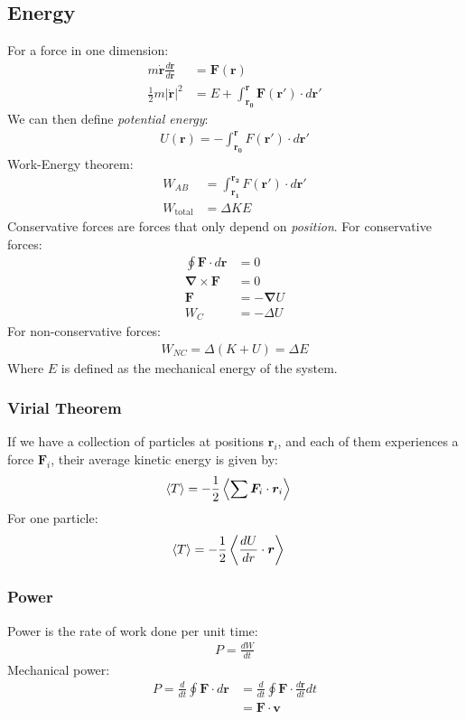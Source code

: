 \documentclass[a4paper]{article}
\newcommand{\ve}[1]{
  \ensuremath{\bm{#1}}}	               %
\newcommand{\ave}[1]{
  \ensuremath{\langle #1 \rangle}}     %
\begin{document}
\begin{multicols*}{2}
\subsection{Energy}
For a force in one dimension:
\begin{align*}
  m \dot{\ve{r}} \frac{d\dot{\ve{r}}}{d\ve{r}} &= \ve{F}(\ve{r}) \\
  \frac{1}{2}m |\dot{\ve{r}}|^2 &= E + \int_{\ve{r_0}}^{\ve{r}} \ve{F}(\ve{r}')
  \cdot d\ve{r}'
\end{align*}
We can then define \emph{potential energy}:
\begin{align*}
  U(\ve{r}) = - \int_{\ve{r_0}}^{\ve{r}} F(\ve{r}') \cdot d\ve{r}'
\end{align*}
Work-Energy theorem:
\begin{align*}
  W_{AB} &= \int_{\ve{r_1}}^{\ve{r_2}} F(\ve{r}') \cdot d\ve{r}' \\
  W_{\text{total}} &= \Delta KE
\end{align*}
Conservative forces are forces that only depend on {\em position}. For
conservative forces:
\begin{align*}
  \oint \ve{F} \cdot d\ve{r} &= 0 \\
  \ve{\nabla} \times \ve{F} &= 0 \\
  \ve{F} &= - \ve{\nabla} U \\
  W_{C} &= -\Delta U
\end{align*}
For non-conservative forces:
\begin{align*}
  W_{NC} = \Delta(K+U) = \Delta E
\end{align*}
Where $E$ is defined as the mechanical energy of the system.
\subsubsection{Virial Theorem}
If we have a collection of particles at positions $\ve{r}_i$, and each of them
experiences a force $\ve{F}_i$, their average kinetic energy is given by:
\begin{align*}
  \ave{ T } &= -\frac{1}{2} \left\ave{ \sum \ve{F}_i \cdot \ve{r}_i \right}
\end{align*}
For one particle:
\begin{align*}
  \ave{ T } &= -\frac{1}{2} \left\ave{ \frac{dU}{dr} \cdot \ve{r} \right}
\end{align*}
\subsubsection{Power}
Power is the rate of work done per unit time:
\begin{align*}
  P=\frac{dW}{dt}
\end{align*}
Mechanical power:
\begin{align*}
  P=\frac{d}{dt}\oint \ve{F} \cdot d\ve{r}&=\frac{d}{dt}\oint \ve{F} \cdot \frac{d\ve{r}}{dt} dt\\
  &=\ve{F} \cdot \ve{v}
\end{align*}

\end{multicols*}
\end{document}
